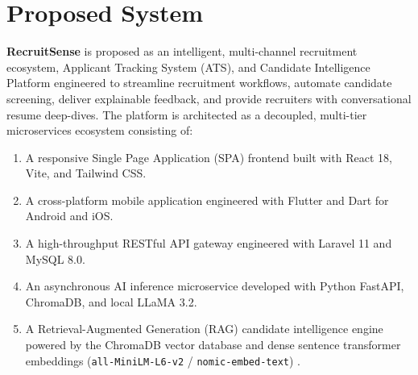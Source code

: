\section{Proposed System}
\textbf{RecruitSense} is proposed as an intelligent, multi-channel recruitment ecosystem, Applicant Tracking System (ATS), and Candidate Intelligence Platform engineered to streamline recruitment workflows, automate candidate screening, deliver explainable feedback, and provide recruiters with conversational resume deep-dives. The platform is architected as a decoupled, multi-tier microservices ecosystem consisting of:
\begin{enumerate}
    \item A responsive Single Page Application (SPA) frontend built with React 18, Vite, and Tailwind CSS.
    \item A cross-platform mobile application engineered with Flutter and Dart for Android and iOS.
    \item A high-throughput RESTful API gateway engineered with Laravel 11 and MySQL 8.0.
    \item An asynchronous AI inference microservice developed with Python FastAPI, ChromaDB, and local LLaMA 3.2.
    \item A Retrieval-Augmented Generation (RAG) candidate intelligence engine powered by the ChromaDB vector database and dense sentence transformer embeddings (\texttt{all-MiniLM-L6-v2} / \texttt{nomic-embed-text}) \cite{lewis2020rag, malkov2018hnsw}.
\end{enumerate}

